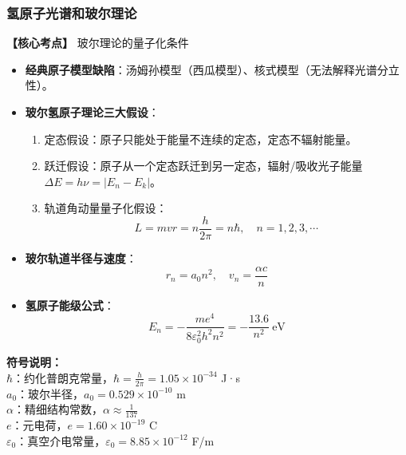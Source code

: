 \subsubsection{氢原子光谱和玻尔理论}
\textbf{【核心考点】} 玻尔理论的量子化条件 \par\vspace{0.3em}
\begin{itemize}
    \item \textbf{经典原子模型缺陷}：汤姆孙模型（西瓜模型）、核式模型（无法解释光谱分立性）。
    \item \textbf{玻尔氢原子理论三大假设}：
          \begin{enumerate}
              \item 定态假设：原子只能处于能量不连续的定态，定态不辐射能量。
              \item 跃迁假设：原子从一个定态跃迁到另一定态，辐射/吸收光子能量$\Delta E = h\nu = |E_n - E_k|$。
              \item 轨道角动量量子化假设：
                    \[
                    L = mvr = n\frac{h}{2\pi} = n\hbar,\quad n=1,2,3,\cdots
                    \]
          \end{enumerate}
    \item \textbf{玻尔轨道半径与速度}：
          \[
          r_n = a_0 n^2,\quad v_n = \frac{\alpha c}{n}
          \]
    \item \textbf{氢原子能级公式}：
          \[
          E_n = -\frac{m e^4}{8\varepsilon_0^2 h^2 n^2} = -\frac{13.6}{n^2}\ \text{eV}
          \]
\end{itemize}

\textbf{符号说明：}\\
$\hbar$：约化普朗克常量，$\hbar = \frac{h}{2\pi} = 1.05\times10^{-34}$ J·s \\
$a_0$：玻尔半径，$a_0=0.529\times10^{-10}$ m \\
$\alpha$：精细结构常数，$\alpha\approx\frac{1}{137}$ \\
$e$：元电荷，$e=1.60\times10^{-19}$ C \\
$\varepsilon_0$：真空介电常量，$\varepsilon_0=8.85\times10^{-12}$ F/m
\vspace{0.5em}

